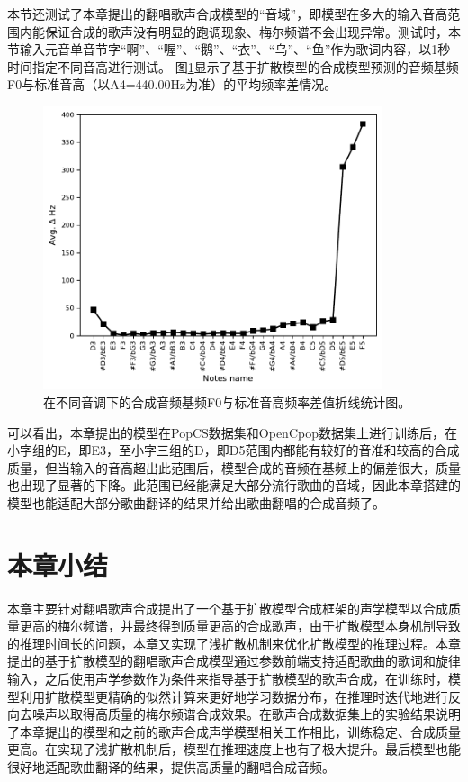 本节还测试了本章提出的翻唱歌声合成模型的``音域''，即模型在多大的输入音高范围内能保证合成的歌声没有明显的跑调现象、梅尔频谱不会出现异常。测试时，本节输入元音单音节字``啊''、``喔''、``鹅''、``衣''、``乌''、``鱼''作为歌词内容，以1秒时间指定不同音高进行测试。
图\ref{fig:pitch_range_delta}显示了基于扩散模型的合成模型预测的音频基频F0与标准音高（以A4=440.00Hz为准）的平均频率差情况。
\begin{figure}[!ht]
  \centering
	\includegraphics[width=0.89\textwidth]{figure/svs/pitch_range_delta.pdf}
	\caption{在不同音调下的合成音频基频F0与标准音高频率差值折线统计图。}
\label{fig:pitch_range_delta}
\end{figure}
可以看出，本章提出的模型在PopCS数据集和OpenCpop数据集上进行训练后，在小字组的E，即E3，至小字三组的D，即D5范围内都能有较好的音准和较高的合成质量，但当输入的音高超出此范围后，模型合成的音频在基频上的偏差很大，质量也出现了显著的下降。此范围已经能满足大部分流行歌曲的音域，因此本章搭建的模型也能适配大部分歌曲翻译的结果并给出歌曲翻唱的合成音频了。

\section{本章小结}
本章主要针对翻唱歌声合成提出了一个基于扩散模型合成框架的声学模型以合成质量更高的梅尔频谱，并最终得到质量更高的合成歌声，由于扩散模型本身机制导致的推理时间长的问题，本章又实现了浅扩散机制来优化扩散模型的推理过程。本章提出的基于扩散模型的翻唱歌声合成模型通过参数前端支持适配歌曲的歌词和旋律输入，之后使用声学参数作为条件来指导基于扩散模型的歌声合成，在训练时，模型利用扩散模型更精确的似然计算来更好地学习数据分布，在推理时迭代地进行反向去噪声以取得高质量的梅尔频谱合成效果。在歌声合成数据集上的实验结果说明了本章提出的模型和之前的歌声合成声学模型相关工作相比，训练稳定、合成质量更高。在实现了浅扩散机制后，模型在推理速度上也有了极大提升。最后模型也能很好地适配歌曲翻译的结果，提供高质量的翻唱合成音频。
